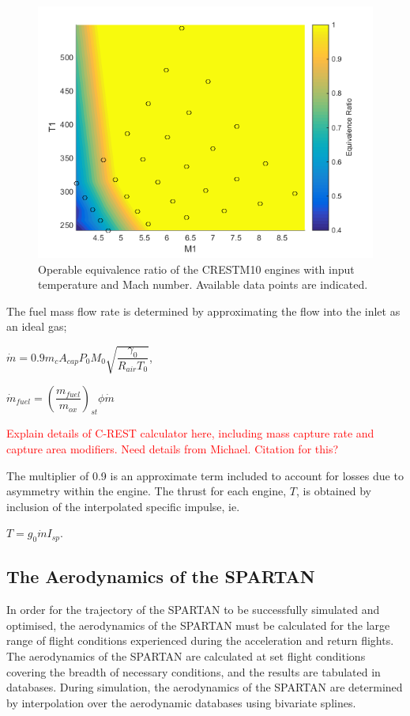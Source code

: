 \begin{figure}[ht]
	\centering
	\includegraphics[width=0.6\linewidth]{figures/3_vehicle_design/EquivalenceRatioInterp}
	\caption{Operable equivalence ratio of the CRESTM10 engines with input temperature and Mach number. Available data points are indicated.}
	\label{fig:EquivalenceRatioInterp}
\end{figure}
The fuel mass flow rate is determined by approximating the flow into the inlet as an ideal gas; 

$\dot{m} = 0.9 m_c A_{cap} P_0 M_0 \sqrt{\dfrac{\gamma_0}{R_{air} T_0}}$,

$\dot{m}_{fuel} = (\dfrac{m_{fuel}}{m_{ox}} )_{st} \phi \dot{m}$

\textcolor{red}{Explain details of C-REST calculator here, including mass capture rate and capture area modifiers. Need details from Michael. Citation for this?}

The multiplier of 0.9 is an approximate term included to account for losses due to asymmetry within the engine. 
The thrust for each engine, $T$, is obtained by inclusion of the interpolated specific impulse, ie. 

$T = g_0\dot{m}I_{sp}$. 







		
		
		\subsection{The Aerodynamics of the SPARTAN}
		
In order for the trajectory of the SPARTAN to be successfully simulated and optimised, the aerodynamics of the SPARTAN must be calculated for the large range of flight conditions experienced during the acceleration and return flights. 
The aerodynamics of the SPARTAN are calculated at set flight conditions covering the breadth of necessary conditions, and the results are tabulated in databases. During simulation, the aerodynamics of the SPARTAN are determined by interpolation over the aerodynamic databases using bivariate splines. 


